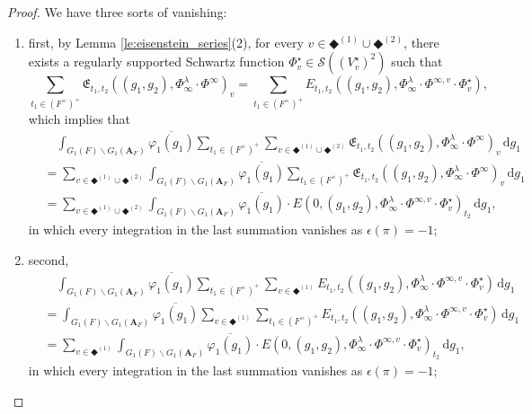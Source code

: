 \documentclass[12pt]{amsart}
\numberwithin{equation}{section}
\theoremstyle{plain}
\theoremstyle{definition}
\theoremstyle{remark}
\renewcommand{\b}[1]{\mathbf{#1}}
\newcommand{\f}[1]{\mathfrak{#1}}
\renewcommand{\r}[1]{\mathrm{#1}}
\newcommand{\s}[1]{\mathscr{#1}}
\renewcommand{\(}{\left(}
\renewcommand{\)}{\right)}
\newcommand{\ol}[1]{\overline{#1}{}}
\newcommand{\bA}{\b A}
\newcommand{\fE}{\f E}
\newcommand{\rd}{\,\r d}
\newcommand{\sS}{\s S}
\begin{document}
\begin{proof}
We have three sorts of vanishing:
\begin{enumerate}
  \item first, by Lemma \ref{le:eisenstein_series}(2), for every $v\in \Diamondblack^{(1)}\cup\Diamondblack^{(2)}$, there exists a regularly supported Schwartz function $\Phi^\star_v\in\sS((V^\star_v)^2)$ such that
      \[
      \sum_{t_1\in(F^\times)^+}\fE_{t_1,t_2}((g_1,g_2),\Phi^\lambda_\infty\cdot\Phi^\infty)_v=
      \sum_{t_1\in(F^\times)^+}E_{t_1,t_2}((g_1,g_2),\Phi^\lambda_\infty\cdot\Phi^{\infty,v}\cdot\Phi^\star_v),
      \]
      which implies that
      \begin{align*}
      &\quad\int_{G_1(F)\backslash G_1(\bA_F)}\ol{\varphi_1(g_1)}\sum_{t_1\in(F^\times)^+}
      \sum_{v\in\Diamondblack^{(1)}\cup\Diamondblack^{(2)}}
      \fE_{t_1,t_2}((g_1,g_2),\Phi^\lambda_\infty\cdot\Phi^\infty)_v \rd g_1\\
      &=\sum_{v\in\Diamondblack^{(1)}\cup\Diamondblack^{(2)}}
      \int_{G_1(F)\backslash G_1(\bA_F)}\ol{\varphi_1(g_1)}
      \sum_{t_1\in(F^\times)^+}\fE_{t_1,t_2}((g_1,g_2),\Phi^\lambda_\infty\cdot\Phi^\infty)_v \rd g_1\\
      &=\sum_{v\in\Diamondblack^{(1)}\cup\Diamondblack^{(2)}}
      \int_{G_1(F)\backslash G_1(\bA_F)}\ol{\varphi_1(g_1)}\cdot
      E(0,(g_1,g_2),\Phi^\lambda_\infty\cdot\Phi^{\infty,v}\cdot\Phi^\star_v)_{t_2}\rd g_1,
      \end{align*}
      in which every integration in the last summation vanishes as $\epsilon(\pi)=-1$;

  \item second,
      \begin{align*}
      &\quad\int_{G_1(F)\backslash G_1(\bA_F)}\ol{\varphi_1(g_1)}
      \sum_{t_1\in(F^\times)^+}
      \sum_{v\in\Diamondblack^{(1)}}E_{t_1,t_2}((g_1,g_2),\Phi^\lambda_\infty\cdot\Phi^{\infty,v}\cdot\Phi^\star_v)\rd g_1 \\
      &=\int_{G_1(F)\backslash G_1(\bA_F)}\ol{\varphi_1(g_1)}
      \sum_{v\in\Diamondblack^{(1)}}\sum_{t_1\in(F^\times)^+}
      E_{t_1,t_2}((g_1,g_2),\Phi^\lambda_\infty\cdot\Phi^{\infty,v}\cdot\Phi^\star_v)\rd g_1 \\
      &=\sum_{v\in\Diamondblack^{(1)}}\int_{G_1(F)\backslash G_1(\bA_F)}\ol{\varphi_1(g_1)}\cdot
      E(0,(g_1,g_2),\Phi^\lambda_\infty\cdot\Phi^{\infty,v}\cdot\Phi^\star_v)_{t_2}\rd g_1,
      \end{align*}
      in which every integration in the last summation vanishes as $\epsilon(\pi)=-1$;


\end{enumerate}
\end{proof}
\end{document}
